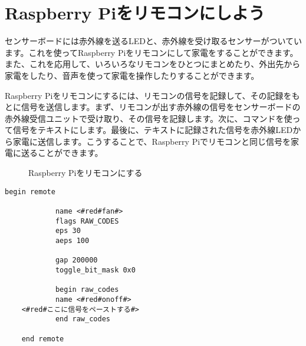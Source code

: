 \newpage
\section{Raspberry Piをリモコンにしよう}
センサーボードには赤外線を送るLEDと、赤外線を受け取るセンサーがついています。これを使ってRaspberry Piをリモコンにして家電をすることができます。また、これを応用して、いろいろなリモコンをひとつにまとめたり、外出先から家電をしたり、音声を使って家電を操作したりすることができます。

Raspberry Piをリモコンにするには、リモコンの信号を記録して、その記録をもとに信号を送信します。まず、リモコンが出す赤外線の信号をセンサーボードの赤外線受信ユニットで受け取り、その信号を記録します。次に、コマンドを使って信号をテキストにします。最後に、テキストに記録された信号を赤外線LEDから家電に送信します。こうすることで、Raspberry Piでリモコンと同じ信号を家電に送ることができます。
\begin{figure}[H]
    \centering
 
    \caption{Raspberry Piをリモコンにする}
\end{figure}
\begin{lstlisting}[caption=template.lircd.conf,label=template.lircd.conf]
    begin remote
    
            name <#red#fan#>
            flags RAW_CODES
            eps 30
            aeps 100
    
            gap 200000
            toggle_bit_mask 0x0
    
            begin raw_codes
            name <#red#onoff#>
    <#red#ここに信号をペーストする#>
            end raw_codes
    
    end remote
    \end{lstlisting}

